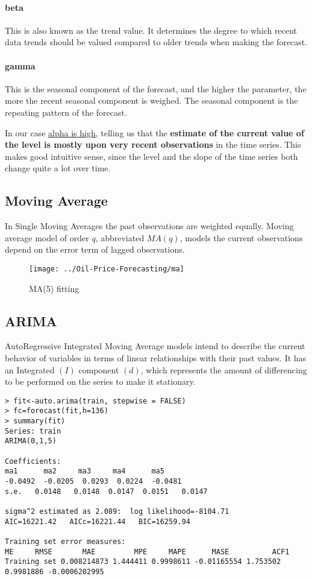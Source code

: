 \documentclass[11pt,a4paper]{article}
\begin{document}
\paragraph{beta} This is also known as the trend value. It determines the degree to which recent data trends should be valued compared to older trends when making the forecast.
\paragraph{gamma} This is the seasonal component of the forecast, and the higher the parameter, the more the recent seasonal component is weighed. The seasonal component is the repeating pattern of the forecast.

In our case \underline{alpha is  high}, telling us that the \textbf{estimate of the current value of the level is mostly upon very recent observations} in the time series. This makes good intuitive sense, since the level and the slope of the time series both change quite a lot over time. 



\subsection{Moving Average}
In Single Moving Averages the past observations are weighted equally.
Moving average model of order $q$, abbreviated $MA(q)$, models the current observations depend on the error term of  lagged observations. 

\begin{figure}[h!]
	\centering
	\texttt{[image: ../Oil-Price-Forecasting/ma]}
	\caption{MA(5) fitting}
	\label{fig:ma}
\end{figure}


\subsection{ARIMA}
 AutoRegressive Integrated Moving Average models intend to describe the current
behavior of variables in terms of linear relationships with their past values. It has an
Integrated $(I)$ component $(d)$, which represents the amount of differencing to be performed
on the series to make it stationary. 
\begin{lstlisting}
> fit<-auto.arima(train, stepwise = FALSE)
> fc=forecast(fit,h=136)
> summary(fit)
Series: train 
ARIMA(0,1,5) 

Coefficients:
ma1      ma2     ma3     ma4      ma5
-0.0492  -0.0205  0.0293  0.0224  -0.0481
s.e.   0.0148   0.0148  0.0147  0.0151   0.0147

sigma^2 estimated as 2.089:  log likelihood=-8104.71
AIC=16221.42   AICc=16221.44   BIC=16259.94

Training set error measures:
ME     RMSE       MAE         MPE     MAPE      MASE          ACF1
Training set 0.008214873 1.444411 0.9998611 -0.01165554 1.753502 0.9981886 -0.0006202995

\end{lstlisting}
\end{document}
